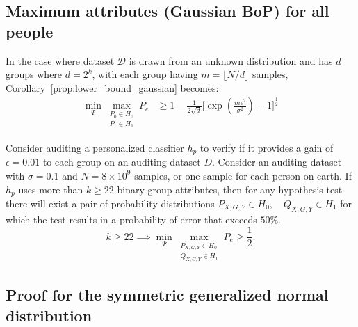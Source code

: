 \subsection{Maximum attributes (Gaussian BoP) for all people}\label{sec:max_attributes_gaussian}
 In the case where dataset $\mathcal{D}$ is drawn from an unknown distribution and has $d$ groups where $d=2^k$, with each group having $m = \lfloor N/d \rfloor$ samples, Corollary~\ref{prop:lower_bound_gaussian} becomes:
\begin{align*}
            \min _{\Psi} 
    \max _{\substack{P_0 \in H_0 \\ P_1 \in H_1}}
        P_e 
        &\geq 1 - \frac{1}{2\sqrt{d}} 
        \Bigg[ \exp\left(\frac{{m}\epsilon^2}{\sigma^2}\right)
            -
            1
            \Bigg]^{\frac{1}{2}}
\end{align*}
\begin{corollary} 
 Consider auditing a personalized classifier $h_p$ to verify if it provides a gain of $\epsilon =0.01$ to each group on an auditing dataset $D$. Consider an auditing dataset with $\sigma = 0.1$ and $N = 8 \times 10^9$ samples, or one sample for each person on earth. If $h_p$ uses more than $k \geq 22$ binary group attributes, then for any hypothesis test there will exist a pair of probability distributions $P_{X,G,Y} \in H_0, \quad Q_{X,G,Y} \in H_1$ for which the test results in a probability of error that exceeds $50 \%$. 
\begin{equation}
       k \geq 22 \implies \min_{\Psi} \max_{\substack{P_{X,G,Y} \in H_0 \\ Q_{X,G,Y} \in H_1}} P_e \geq \frac{1}{2}.
\end{equation}
\end{corollary}

\subsection{Proof for the symmetric generalized normal distribution}\label{subsec:symm_gauss}

